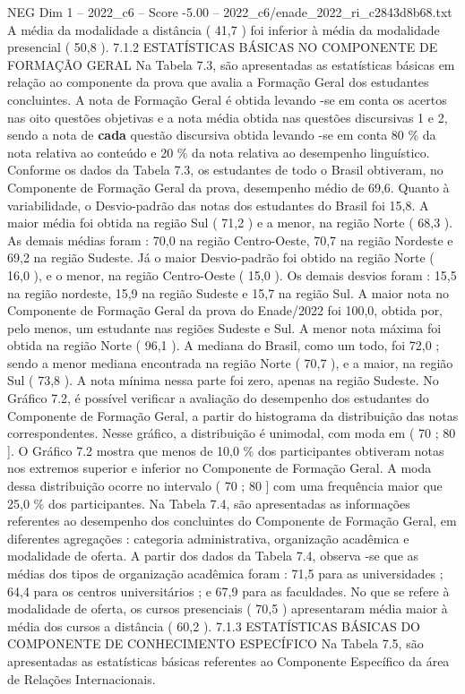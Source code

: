 \begin{textsample}{NEG Dim 1 – 2022\_c6 – Score -5.00 – 2022\_c6/enade\_2022\_ri\_c2843d8b68.txt}
A média da modalidade a distância ( 41,7 ) foi inferior à média da modalidade presencial ( 50,8 ). 7.1.2 ESTATÍSTICAS BÁSICAS NO COMPONENTE DE FORMAÇÃO GERAL Na Tabela 7.3, são apresentadas as estatísticas básicas em relação ao componente da prova que avalia a Formação Geral dos estudantes concluintes.
A nota de Formação Geral é obtida levando -se em conta os acertos nas oito questões objetivas e a nota média obtida nas questões discursivas 1 e 2, sendo a nota de \textbf{cada} questão discursiva obtida levando -se em conta 80 \% da nota relativa ao conteúdo e 20 \% da nota relativa ao desempenho linguístico.
Conforme os dados da Tabela 7.3, os estudantes de todo o Brasil obtiveram, no Componente de Formação Geral da prova, desempenho médio de 69,6.
Quanto à variabilidade, o Desvio-padrão das notas dos estudantes do Brasil foi 15,8.
A maior média foi obtida na região Sul ( 71,2 ) e a menor, na região Norte ( 68,3 ).
As demais médias foram : 70,0 na região Centro-Oeste, 70,7 na região Nordeste e 69,2 na região Sudeste.
Já o maior Desvio-padrão foi obtido na região Norte ( 16,0 ), e o menor, na região Centro-Oeste ( 15,0 ).
Os demais desvios foram : 15,5 na região nordeste, 15,9 na região Sudeste e 15,7 na região Sul.
A maior nota no Componente de Formação Geral da prova do Enade/2022 foi 100,0, obtida por, pelo menos, um estudante nas regiões Sudeste e Sul.
A menor nota máxima foi obtida na região Norte ( 96,1 ).
A mediana do Brasil, como um todo, foi 72,0 ; sendo a menor mediana encontrada na região Norte ( 70,7 ), e a maior, na região Sul ( 73,8 ).
A nota mínima nessa parte foi zero, apenas na região Sudeste.
No Gráfico 7.2, é possível verificar a avaliação do desempenho dos estudantes do Componente de Formação Geral, a partir do histograma da distribuição das notas correspondentes.
Nesse gráfico, a distribuição é unimodal, com moda em ( 70 ; 80 ].
O Gráfico 7.2 mostra que menos de 10,0 \% dos participantes obtiveram notas nos extremos superior e inferior no Componente de Formação Geral.
A moda dessa distribuição ocorre no intervalo ( 70 ; 80 ] com uma frequência maior que 25,0 \% dos participantes.
Na Tabela 7.4, são apresentadas as informações referentes ao desempenho dos concluintes do Componente de Formação Geral, em diferentes agregações : categoria administrativa, organização acadêmica e modalidade de oferta.
A partir dos dados da Tabela 7.4, observa -se que as médias dos tipos de organização acadêmica foram : 71,5 para as universidades ; 64,4 para os centros universitários ; e 67,9 para as faculdades.
No que se refere à modalidade de oferta, os cursos presenciais ( 70,5 ) apresentaram média maior à média dos cursos a distância ( 60,2 ). 7.1.3 ESTATÍSTICAS BÁSICAS DO COMPONENTE DE CONHECIMENTO ESPECÍFICO Na Tabela 7.5, são apresentadas as estatísticas básicas referentes ao Componente Específico da área de Relações Internacionais.

\end{textsample}
